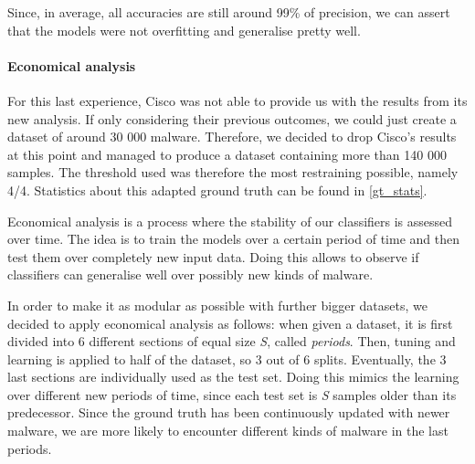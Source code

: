 \begin{table}[H]
    \centering
    \caption{Test accuracies obtained using 5-fold cross-validation}
    \label{Tab:k_fold}
\end{table}

Since, in average, all accuracies are still around 99\% of precision, we can assert that the models were not overfitting and generalise pretty well.

\paragraph{Economical analysis}

For this last experience, Cisco was not able to provide us with the results from its new analysis. If only considering their previous outcomes, we could just create a dataset of around 30 000 malware. Therefore, we decided to drop Cisco's results at this point and managed to produce a dataset containing more than 140 000 samples. The threshold used was therefore the most restraining possible, namely 4/4. Statistics about this adapted ground truth can be found in \autoref{gt_stats}.

Economical analysis is a process where the stability of our classifiers is assessed over time. The idea is to train the models over a certain period of time and then test them over completely new input data. Doing this allows to observe if classifiers can generalise well over possibly new kinds of malware.

In order to make it as modular as possible with further bigger datasets, we decided to apply economical analysis as follows: when given a dataset, it is first divided into 6 different sections of equal size \textit{S}, called \textit{periods}. Then, tuning and learning is applied to half of the dataset, so 3 out of 6 splits. Eventually, the 3 last sections are individually used as the test set. Doing this mimics the learning over different new periods of time, since each test set is \textit{S} samples older than its predecessor. Since the ground truth has been continuously updated with newer malware, we are more likely to encounter different kinds of malware in the last periods. 

